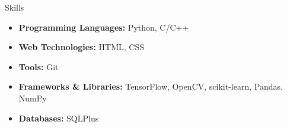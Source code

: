 \documentclass{resume} %
\begin{document}
\begin{rSection}{Skills}
\begin{itemize}
    \item {\bf Programming Languages:} Python, C/C++
    \item {\bf Web Technologies:} HTML, CSS
    \item {\bf Tools:} Git
    \item {\bf Frameworks \& Libraries:} TensorFlow, OpenCV, scikit-learn, Pandas, NumPy
    \item {\bf Databases:} SQLPlus
\end{itemize}
\end{rSection}
\end{document}
